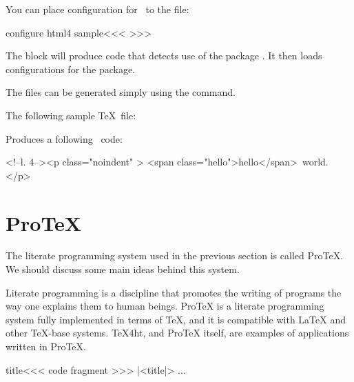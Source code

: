 You can place configuration for \HTML\ to the  file:

\begin{texsource}
\<configure html4 sample\><<<
>>>
\end{texsource}

The  block will produce code that 
detects use of the package . It then loads configurations
for the package.


The  files can be generated simply using the  command.

The following sample \TeX\ file:


Produces a following \HTML\ code:

\begin{htmlsource}
<!--l. 4--><p class="noindent" >
<span class="hello">hello</span> world. 
</p> 
\end{htmlsource}




\section{ProTeX}


The literate programming system used in the previous section is called ProTeX. We should discuss some main ideas behind this system.


Literate programming is a discipline that promotes the writing of programs the
way one explains them to human beings. ProTeX is a literate programming system
fully implemented in terms of TeX, and it is compatible with LaTeX and other
TeX-base systems. TeX4ht, and ProTeX itself, are examples of applications
written in ProTeX.


\begin{texsource}

\<title\><<<
code fragment
>>>  
|<title|>
\OutputCode\<...\> 
\end{texsource}

